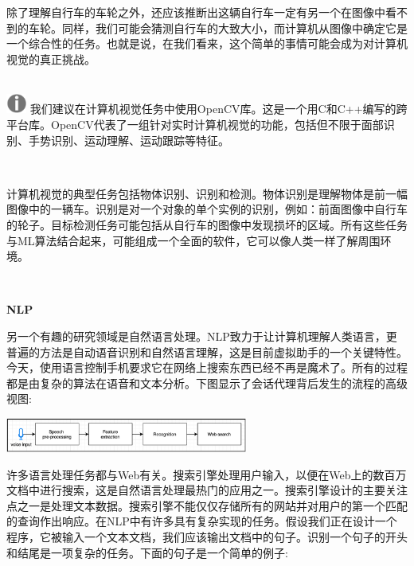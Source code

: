 除了理解自行车的车轮之外，还应该推断出这辆自行车一定有另一个在图像中看不到的车轮。同样，我们可能会猜测自行车的大致大小，而计算机从图像中确定它是一个综合性的任务。也就是说，在我们看来，这个简单的事情可能会成为对计算机视觉的真正挑战。 \par

\hspace*{\fill} \\ %
\includegraphics[width=0.05\textwidth]{images/warn}
我们建议在计算机视觉任务中使用OpenCV库。这是一个用C和C++编写的跨平台库。OpenCV代表了一组针对实时计算机视觉的功能，包括但不限于面部识别、手势识别、运动理解、运动跟踪等特征。 \par
\noindent\textbf{}\ \par

计算机视觉的典型任务包括物体识别、识别和检测。物体识别是理解物体是前一幅图像中的一辆车。识别是对一个对象的单个实例的识别，例如：前面图像中自行车的轮子。目标检测任务可能包括从自行车的图像中发现损坏的区域。所有这些任务与ML算法结合起来，可能组成一个全面的软件，它可以像人类一样了解周围环境。 \par

\noindent\textbf{}\ \par
\textbf{NLP} \ \par
另一个有趣的研究领域是自然语言处理。NLP致力于让计算机理解人类语言，更普遍的方法是自动语音识别和自然语言理解，这是目前虚拟助手的一个关键特性。今天，使用语言控制手机要求它在网络上搜索东西已经不再是魔术了。所有的过程都是由复杂的算法在语音和文本分析。下图显示了会话代理背后发生的流程的高级视图: \par

\begin{center}
	\includegraphics[width=0.6\textwidth]{content/Section-3/Chapter-15/4}
\end{center}

许多语言处理任务都与Web有关。搜索引擎处理用户输入，以便在Web上的数百万文档中进行搜索，这是自然语言处理最热门的应用之一。搜索引擎设计的主要关注点之一是处理文本数据。搜索引擎不能仅仅存储所有的网站并对用户的第一个匹配的查询作出响应。在NLP中有许多具有复杂实现的任务。假设我们正在设计一个程序，它被输入一个文本文档，我们应该输出文档中的句子。识别一个句子的开头和结尾是一项复杂的任务。下面的句子是一个简单的例子: \par

